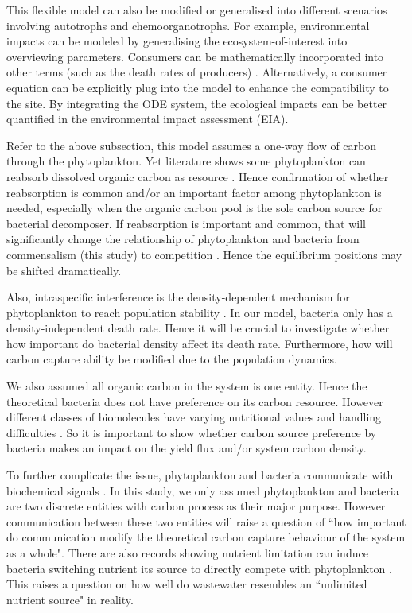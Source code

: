 \documentclass[../thesis.tex]{subfiles} %
\begin{document}
This flexible model can also be modified or generalised into different scenarios involving autotrophs and chemoorganotrophs.  For example, environmental impacts can be modeled by generalising the ecosystem-of-interest into overviewing parameters.  Consumers can be mathematically incorporated into other terms (such as the death rates of producers) \autocite{hurtt1996pelagic}.  Alternatively, a consumer equation can be explicitly plug into the model to enhance the compatibility to the site.  By integrating the ODE system, the ecological impacts can be better quantified in the environmental impact assessment (EIA).

Refer to the above subsection, this model assumes a one-way flow of carbon through the phytoplankton.  Yet literature shows some phytoplankton can reabsorb dissolved organic carbon as resource \autocite{j1989respiration,bratbak1985phytoplankton,samejima1958heterotrophic}.  Hence confirmation of whether reabsorption is common and/or an important factor among phytoplankton is needed, especially when the organic carbon pool is the sole carbon source for bacterial decomposer.  If reabsorption is important and common, that will significantly change the relationship of phytoplankton and bacteria from commensalism (this study) to competition \autocite{bratbak1985phytoplankton}.  Hence the equilibrium positions may be shifted dramatically.

Also, intraspecific interference is the density-dependent mechanism for phytoplankton to reach population stability \autocite{o2017unexpected,savage2004effects,allen2007recasting,bernhardt2018metabolic}.  In our model, bacteria only has a density-independent death rate.  Hence it will be crucial to investigate whether how important do bacterial density affect its death rate.  Furthermore, how will carbon capture ability be modified due to the population dynamics.

We also assumed all organic carbon in the system is one entity.  Hence the theoretical bacteria does not have preference on its carbon resource.  However different classes of biomolecules have varying nutritional values and handling difficulties \autocite{amon1996bacterial}.  So it is important to show whether carbon source preference by bacteria makes an impact on the yield flux and/or system carbon density.

To further complicate the issue, phytoplankton and bacteria communicate with biochemical signals \autocite{beliaev2014inference,amin2012interactions}.  In this study, we only assumed phytoplankton and bacteria are two discrete entities with carbon process as their major purpose.  However communication between these two entities will raise a question of ``how important do communication modify the theoretical carbon capture behaviour of the system as a whole".  There are also records showing nutrient limitation can induce bacteria switching nutrient its source to directly compete with phytoplankton \autocite{danger2007bacteria}.  This raises a question on how well do wastewater resembles an ``unlimited nutrient source" in reality.
\end{document}
